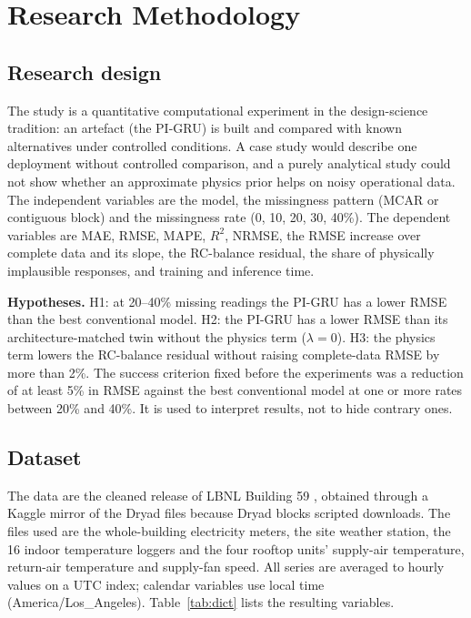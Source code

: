 \section{Research Methodology}\label{sec:method}

\subsection{Research design}
The study is a quantitative computational experiment in the design-science tradition: an artefact (the PI-GRU) is built and compared with known alternatives under controlled conditions. A case study would describe one deployment without controlled comparison, and a purely analytical study could not show whether an approximate physics prior helps on noisy operational data. The independent variables are the model, the missingness pattern (MCAR or contiguous block) and the missingness rate (0, 10, 20, 30, 40\%). The dependent variables are MAE, RMSE, MAPE, $R^2$, NRMSE, the RMSE increase over complete data and its slope, the RC-balance residual, the share of physically implausible responses, and training and inference time.

\textbf{Hypotheses.} H1: at 20--40\% missing readings the PI-GRU has a lower RMSE than the best conventional model. H2: the PI-GRU has a lower RMSE than its architecture-matched twin without the physics term ($\lambda=0$). H3: the physics term lowers the RC-balance residual without raising complete-data RMSE by more than 2\%. The success criterion fixed before the experiments was a reduction of at least 5\% in RMSE against the best conventional model at one or more rates between 20\% and 40\%. It is used to interpret results, not to hide contrary ones.

\subsection{Dataset}\label{sec:data}
The data are the cleaned release of LBNL Building 59 \citep{luo2022dataset,hong2022dryad}, obtained through a Kaggle mirror of the Dryad files because Dryad blocks scripted downloads. The files used are the whole-building electricity meters, the site weather station, the 16 indoor temperature loggers and the four rooftop units' supply-air temperature, return-air temperature and supply-fan speed. All series are averaged to hourly values on a UTC index; calendar variables use local time (America/Los\_Angeles). Table~\ref{tab:dict} lists the resulting variables.

